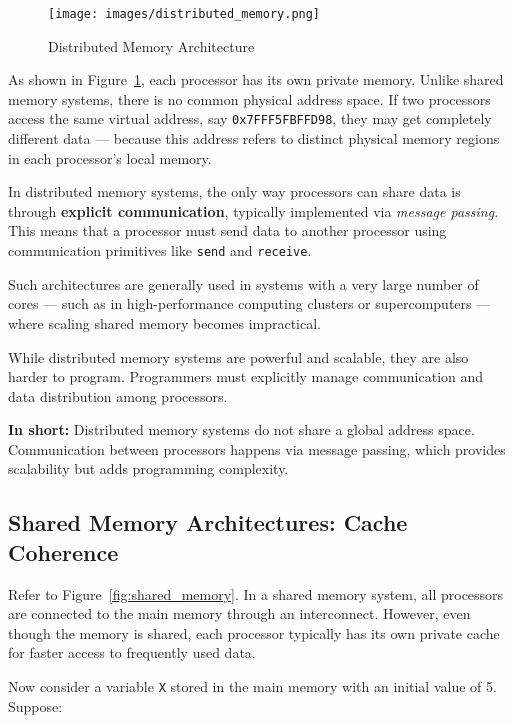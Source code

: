 \documentclass[12pt]{book}
\begin{document}
\begin{figure}[H]
    \centering
    \texttt{[image: images/distributed\_memory.png]}
    \caption{Distributed Memory Architecture}
    \label{fig:distributed_memory}
\end{figure}

As shown in Figure~\ref{fig:distributed_memory}, each processor has its own private memory. Unlike shared memory systems, there is no common physical address space. If two processors access the same virtual address, say \texttt{0x7FFF5FBFFD98}, they may get completely different data — because this address refers to distinct physical memory regions in each processor's local memory.

In distributed memory systems, the only way processors can share data is through \textbf{explicit communication}, typically implemented via \textit{message passing}. This means that a processor must send data to another processor using communication primitives like \texttt{send} and \texttt{receive}.

Such architectures are generally used in systems with a very large number of cores — such as in high-performance computing clusters or supercomputers — where scaling shared memory becomes impractical.

While distributed memory systems are powerful and scalable, they are also harder to program. Programmers must explicitly manage communication and data distribution among processors.

\textbf{In short:} Distributed memory systems do not share a global address space. Communication between processors happens via message passing, which provides scalability but adds programming complexity.


\subsection{Shared Memory Architectures: Cache Coherence}

Refer to Figure~\ref{fig:shared_memory}. In a shared memory system, all processors are connected to the main memory through an interconnect. However, even though the memory is shared, each processor typically has its own private cache for faster access to frequently used data.

Now consider a variable \texttt{X} stored in the main memory with an initial value of 5. Suppose:
\end{document}
